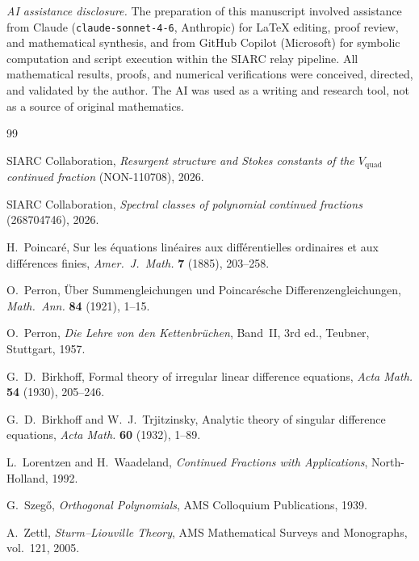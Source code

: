 \documentclass[11pt,a4paper]{amsart}
\theoremstyle{plain}
\theoremstyle{definition}
\theoremstyle{remark}
\begin{document}
\smallskip
\noindent\textit{AI assistance disclosure.}
The preparation of this manuscript involved
assistance from Claude
(\texttt{claude-sonnet-4-6}, Anthropic) for
\LaTeX{} editing, proof review, and
mathematical synthesis, and from GitHub
Copilot (Microsoft) for symbolic computation
and script execution within the SIARC relay
pipeline.  All mathematical results, proofs,
and numerical verifications were conceived,
directed, and validated by the author.
The AI was used as a writing and research
tool, not as a source of original mathematics.

\begin{thebibliography}{99}

  SIARC Collaboration,
  \emph{Resurgent structure and Stokes constants of the $V_{\mathrm{quad}}$
  continued fraction} (NON-110708), 2026.

  SIARC Collaboration,
  \emph{Spectral classes of polynomial continued fractions}
  (268704746), 2026.

  H.~Poincar\'e,
  Sur les \'equations lin\'eaires aux diff\'erentielles ordinaires
  et aux diff\'erences finies,
  \emph{Amer.\ J.\ Math.} \textbf{7} (1885), 203--258.

  O.~Perron,
  \"Uber Summengleichungen und Poincar\'esche Differenzengleichungen,
  \emph{Math.\ Ann.} \textbf{84} (1921), 1--15.

  O.~Perron,
  \emph{Die Lehre von den Kettenbr\"uchen},
  Band~II, 3rd ed., Teubner, Stuttgart, 1957.

  G.~D.~Birkhoff,
  Formal theory of irregular linear difference equations,
  \emph{Acta Math.} \textbf{54} (1930), 205--246.

  G.~D.~Birkhoff and W.~J.~Trjitzinsky,
  Analytic theory of singular difference equations,
  \emph{Acta Math.} \textbf{60} (1932), 1--89.

  L.~Lorentzen and H.~Waadeland,
  \emph{Continued Fractions with Applications},
  North-Holland, 1992.

  G.~Szeg\H{o},
  \emph{Orthogonal Polynomials},
  AMS Colloquium Publications, 1939.

  A.~Zettl,
  \emph{Sturm--Liouville Theory},
  AMS Mathematical Surveys and Monographs, vol.~121, 2005.


\end{thebibliography}
\end{document}
